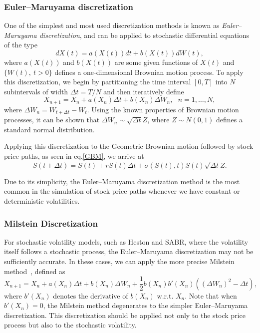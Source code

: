 \subsubsection{Euler–Maruyama discretization}
One of the simplest and most used discretization methods is known as \emph{Euler–Maruyama discretization}, and can be applied to stochastic differential equations of the type
\begin{equation}\label{SDE}
dX(t)=a(X(t))dt+b(X(t))dW(t),
\end{equation}
\noindent where $a(X(t))$ and $b(X(t))$ are some given functions of $X(t)$ and $\{W(t),\ t>0\}$ defines a one-dimensional Brownian motion process.
To apply this discretization, we begin by partitioning the time interval $[0,T]$ into $N$ subintervals of width $\Delta t=T/N$ and then iteratively define
\begin{equation}
X_{n+1}=X_n+a(X_n)\Delta t+b(X_n)\Delta W_n,\ \ \ n=1,\ldots,N,
\end{equation}
\noindent where $\Delta W_n=W_{t+\Delta t}-W_{t}$.
Using the known properties of Brownian motion processes, it can be shown that $\Delta W_n\sim \sqrt{\Delta t}Z$, where $Z\sim N(0,1)$ defines a standard normal distribution.

Applying this discretization to the Geometric Brownian motion followed by stock price paths, as seen in eq.\eqref{GBM}, we arrive at
\begin{equation}
S(t+\Delta t)=S(t)+rS(t)\Delta t+\sigma(S(t),t)S(t)\sqrt{\Delta t}Z.
\end{equation}

Due to its simplicity, the Euler–Maruyama discretization method is the most common in the simulation of stock price paths whenever we have constant or deterministic volatilities.


\subsubsection{Milstein Discretization}
For stochastic volatility models, such as Heston and SABR, where the volatility itself follows a stochastic process, the Euler–Maruyama discretization may not be sufficiently accurate. In these cases, we can apply the more precise Milstein method~\citep{Milstein}, defined as
\begin{equation}
X_{n+1}=X_n+a(X_n)\Delta t+b(X_n)\Delta W_n+\frac{1}{2}b(X_n)b'(X_n)((\Delta W_n)^2-\Delta t),
\end{equation}
\noindent where $b'(X_n)$ denotes the derivative of $b(X_n)$ w.r.t. $X_n$. Note that when $b'(X_n)=0$, the Milstein method degenerates to the simpler Euler–Maruyama discretization. This discretization should be applied not only to the stock price process but also to the stochastic volatility.

